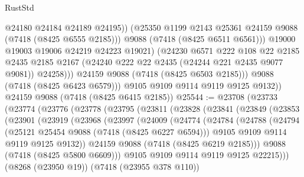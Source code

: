 \begin{lexlean}{RustStd}
\begin{coremodule}
                        @24180
                        @24184
                        @24189
                        @24195))
                    (@25350 @1199 @2143 @25361 @24159 @9088 (@7418 (@8425 @6555 @2185)))
                    @9088
                    (@7418 (@8425 @6511 @6561)))
                  @19000
                  @19003
                  @19006
                  @24219
                  @24223
                  @19021)
                (@24230
                  @6571
                  @222
                  @108
                  @22
                  @2185
                  @2435
                  @2185
                  @2167
                  (@24240 @222 @22 @2435 (@24244 @221 @2435 @9077 @9081))
                  @24258)))
            @24159
            @9088
            (@7418 (@8425 @6503 @2185)))
          @9088
          (@7418 (@8425 @6423 @6579)))
        @9105
        @9109
        @9114
        @9119
        @9125
        @9132))
    @24159
    @9088
    (@7418 (@8425 @6415 @2185))
@25544 := @23708
    (@23733
      (@23774
        (@23776
          (@23778
            (@23795
              (@23811
                (@23828
                  (@23841
                    (@23849
                      (@23853
                        (@23901
                          (@23919
                            (@23968
                              (@23997
                                (@24009
                                  (@24774
                                    (@24784
                                      (@24788
                                        (@24794
                                          (@25121 @25454 @9088 (@7418 (@8425 @6227 @6594)))
                                          @9105
                                          @9109
                                          @9114
                                          @9119
                                          @9125
                                          @9132))
                                      @24159
                                      @9088
                                      (@7418 (@8425 @6219 @2185)))
                                    @9088
                                    (@7418 (@8425 @5800 @6609)))
                                  @9105
                                  @9109
                                  @9114
                                  @9119
                                  @9125
                                  @22215)))
                            (@8268 (@23950 @19))
                            (@7418 (@23955 @378 @110))

\end{coremodule}
\end{lexlean}
